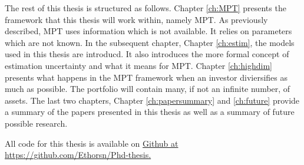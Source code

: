 The rest of this thesis is structured as follows. 
Chapter \ref{ch:MPT} presents the framework that this thesis will work within, namely MPT. 
As previously described, MPT uses information which is not available. 
It relies on parameters which are not known. 
In the subsequent chapter, Chapter \ref{ch:estim}, the models used in this thesis are introducd. 
It also introduces the more formal concept of estimation uncertainty and what it means for MPT.
Chapter \ref{ch:highdim} presents what happens in the MPT framework when an investor diviersifies as much as possible.
The portfolio will contain many, if not an infinite number, of assets.
The last two chapters, Chapter \ref{ch:papersummary} and \ref{ch:future} provide a summary of the papers presented in this thesis as well as a summary of future possible research.

All code for this thesis is available on \href{https://github.com/Ethorsn/Phd-thesis}{Github at https://github.com/Ethorsn/Phd-thesis.}
